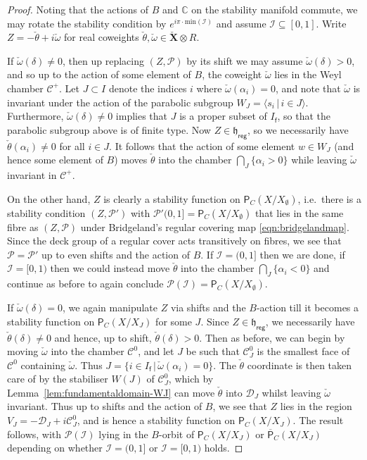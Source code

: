 \documentclass[reqno,a4paper]{amsart}
\newcommand{\calC}{\mathcal{C}}
\newcommand{\calD}{\mathcal{D}}
\newcommand{\calI}{\mathcal{I}}
\newcommand{\calP}{\mathcal{P}}
\newcommand{\C}{\mathbb{C}}
\newcommand{\sff}{\mathsf{f}}
\newcommand{\frakh}{\mathfrak{h}}
\newcommand{\bfX}{\mathbf{X}}
\newcommand{\catPC}{\mathsf{P}_{C}}
\newcommand{\barcatPC}{\overline{\mathsf{P}}_{C}}
\newcommand{\Lomega}{\check{\omega}}
\newcommand{\Ltheta}{\check{\theta}}
\newcommand{\weightlattice}{\bfX}
\newcommand{\coweightlattice}{\check{\weightlattice}}
\newcommand{\rsv}{X}
\newcommand{\ssv}{X_\emptyset}
\newcommand{\psv}{X_J}
\theoremstyle{basic-theorem}
\numberwithin{equation}{section}
\begin{document}
\begin{proof}
    Noting that the actions of $B$ and $\C$ on the stability manifold commute, we may rotate the stability condition by $e^{i\pi\cdot \text{min}(\calI)}$ and assume $\calI\subseteq [0,1]$. Write $Z=-\Ltheta+i\Lomega$ for real coweights $\Ltheta,\Lomega\in\coweightlattice\otimes R$.

    If $\Lomega(\delta)\neq 0$, then up replacing $(Z,\calP)$ by its shift we may assume $\Lomega(\delta)>0$, and so up to the action of some element of $B$, the coweight $\Lomega$ lies in the Weyl chamber $\calC^+$. Let $J\subset I$ denote the indices $i$ where $\Lomega(\alpha_i)=0$, and note that $\Lomega$ is invariant under the action of the parabolic subgroup $W_J=\langle  s_i\,\vert\, i\in J \rangle$. Furthermore, $\Lomega(\delta)\neq 0$ implies that $J$ is a proper subset of $I_\sff$, so that the parabolic subgroup above is of finite type. Now $Z\in\frakh_\mathsf{reg}$, so we necessarily have $\Ltheta(\alpha_i)\neq 0$ for all $i\in J$. It follows that the action of some element $w\in W_J$ (and hence some element of $B$) moves $\Ltheta$ into the chamber $\bigcap_J\{\alpha_i>0\}$ while leaving $\Lomega$ invariant in $\calC^+$.

    On the other hand, $Z$ is clearly a stability function on $\catPC(\rsv/\ssv)$, i.e.\ there is a stability condition $(Z,\calP')$ with $\calP'(0,1]=\catPC(\rsv/\ssv)$ that lies in the same fibre as $(Z,\calP)$ under Bridgeland's regular covering map \eqref{eqn:bridgelandmap}. Since the deck group of a regular cover acts transitively on fibres, we see that $\calP=\calP'$ up to even shifts and the action of $B$. If $\calI=(0,1]$ then we are done, if $\calI=[0,1)$ then we could instead move $\Ltheta$ into the chamber $\bigcap_J\{\alpha_i<0\}$ and continue as before to again conclude $\calP(\calI)=\catPC(\rsv/\ssv)$.
    
    \medskip

    If $\Lomega(\delta)=0$, we again manipulate $Z$ via shifts and the $B$-action till it becomes a stability function on $\catPC(\rsv/\psv)$ for some $J$. Since $Z\in \frakh_\mathsf{reg}$, we necessarily have $\Ltheta(\delta)\neq 0$ and hence, up to shift, $\Ltheta(\delta)>0$. Then as before, we can begin by moving $\Lomega$ into the chamber $\calC^0$, and let $J$ be such that $\calC^0_J$ is the smallest face of $\calC^0$ containing $\Lomega$. Thus $J=\{i\in I_\sff\,\vert\,\Lomega(\alpha_i)=0\}$. The $\Ltheta$ coordinate is then taken care of by the stabiliser $W(J)$ of $\calC_J^0$, which by Lemma~\ref{lem:fundamentaldomain-WJ} can move $\Ltheta$ into $\calD_J$ whilst leaving $\Lomega$ invariant. Thus up to shifts and the action of $B$, we see that $Z$ lies in the region $V_J=-\calD_J+i\calC_J^0$, and is hence a stability function on $\catPC(\rsv/\psv)$. The result follows, with $\calP(\calI)$ lying in the $B$-orbit of $\catPC(\rsv/\psv)$ or $\barcatPC(\rsv/\psv)$ depending on whether $\calI=(0,1]$ or $\calI=[0,1)$ holds.
\end{proof}
\end{document}
